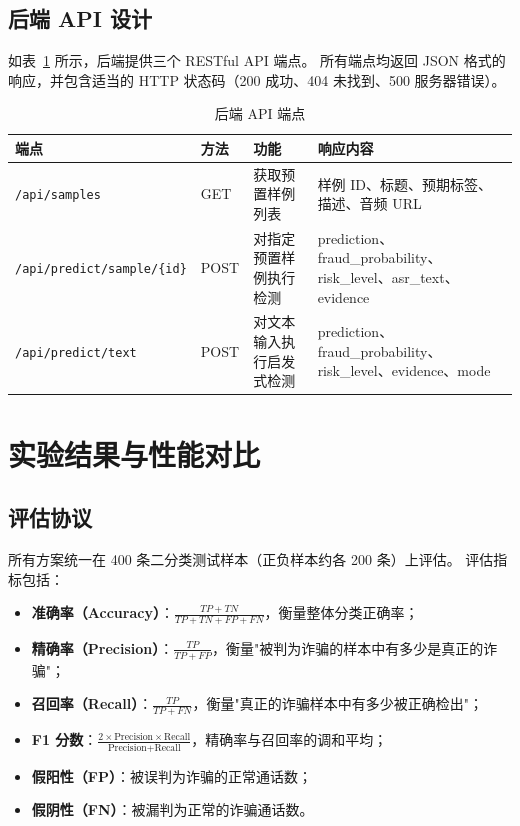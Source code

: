 \documentclass[11pt,a4paper]{ctexart}
\begin{document}
\subsection{后端 API 设计}

如表~\ref{tab:api} 所示，后端提供三个 RESTful API 端点。
所有端点均返回 JSON 格式的响应，并包含适当的 HTTP 状态码（200 成功、404 未找到、500 服务器错误）。

\begin{table}[H]\centering
\caption{后端 API 端点}
\label{tab:api}
\begin{tabular}{@{}lllp{5cm}@{}}\toprule
\textbf{端点} & \textbf{方法} & \textbf{功能} & \textbf{响应内容}\\\midrule
\texttt{/api/samples} & GET & 获取预置样例列表 & 样例 ID、标题、预期标签、描述、音频 URL\\
\texttt{/api/predict/sample/\{id\}} & POST & 对指定预置样例执行检测 & prediction、fraud\_probability、risk\_level、asr\_text、evidence\\
\texttt{/api/predict/text} & POST & 对文本输入执行启发式检测 & prediction、fraud\_probability、risk\_level、evidence、mode\\\bottomrule
\end{tabular}
\end{table}

\section{实验结果与性能对比}

\subsection{评估协议}

所有方案统一在 400 条二分类测试样本（正负样本约各 200 条）上评估。
评估指标包括：

\begin{itemize}
  \item \textbf{准确率（Accuracy）}：$\frac{TP+TN}{TP+TN+FP+FN}$，衡量整体分类正确率；
  \item \textbf{精确率（Precision）}：$\frac{TP}{TP+FP}$，衡量"被判为诈骗的样本中有多少是真正的诈骗"；
  \item \textbf{召回率（Recall）}：$\frac{TP}{TP+FN}$，衡量"真正的诈骗样本中有多少被正确检出"；
  \item \textbf{F1 分数}：$\frac{2 \times \text{Precision} \times \text{Recall}}{\text{Precision} + \text{Recall}}$，精确率与召回率的调和平均；
  \item \textbf{假阳性（FP）}：被误判为诈骗的正常通话数；
  \item \textbf{假阴性（FN）}：被漏判为正常的诈骗通话数。
\end{itemize}
\end{document}
